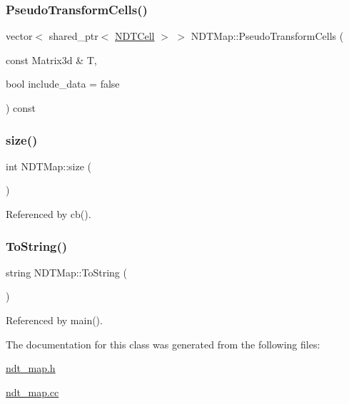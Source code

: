 \mbox{\label{classNDTMap_aae233bcc01ec9e8af59fb45bd235736b}} 
\subsubsection{\texorpdfstring{Pseudo\+Transform\+Cells()}{PseudoTransformCells()}\hspace{0.1cm}{\footnotesize\ttfamily [2/2]}}
{\footnotesize\ttfamily vector$<$ shared\+\_\+ptr$<$ \hyperlink{classNDTCell}{N\+D\+T\+Cell} $>$ $>$ N\+D\+T\+Map\+::\+Pseudo\+Transform\+Cells (\begin{DoxyParamCaption}\item[{const Matrix3d \&}]{T,  }\item[{bool}]{include\+\_\+data = {\ttfamily false} }\end{DoxyParamCaption}) const}

\mbox{\label{classNDTMap_a72afff09b746b402d277945231af5d60}} 
\subsubsection{\texorpdfstring{size()}{size()}}
{\footnotesize\ttfamily int N\+D\+T\+Map\+::size (\begin{DoxyParamCaption}{ }\end{DoxyParamCaption})\hspace{0.3cm}{\ttfamily [inline]}}



Referenced by cb().

\mbox{\label{classNDTMap_ab08b05e7708a1c28d6c9c0f27287a1c8}} 
\subsubsection{\texorpdfstring{To\+String()}{ToString()}}
{\footnotesize\ttfamily string N\+D\+T\+Map\+::\+To\+String (\begin{DoxyParamCaption}{ }\end{DoxyParamCaption})\hspace{0.3cm}{\ttfamily [inline]}}



Referenced by main().



The documentation for this class was generated from the following files\+:\begin{DoxyCompactItemize}
\item 
\hyperlink{ndt__map_8h}{ndt\+\_\+map.\+h}\item 
\hyperlink{ndt__map_8cc}{ndt\+\_\+map.\+cc}\end{DoxyCompactItemize}
